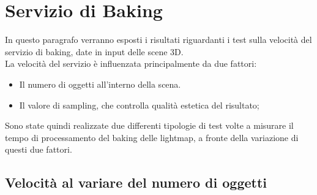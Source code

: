 \section{Servizio di Baking}
\label{sec:chapter_prove_sperimentali_servizio_baking}

In questo paragrafo verranno esposti i risultati riguardanti i test sulla velocità del servizio di baking, date in input delle scene 3D.
\\ 
La velocità del servizio è influenzata principalmente da due fattori:
\begin{itemize}
\item Il numero di oggetti all’interno della scena.
\item Il valore di sampling, che controlla qualità estetica del risultato;
\end{itemize}
Sono state quindi realizzate due differenti tipologie di test volte a misurare il tempo di processamento del baking delle lightmap, a fronte della variazione di questi due fattori.  

\subsection{Velocità al variare del numero di oggetti}
\label{sec:chapter_prove_sperimentali_servizio_baking_vel_obj}

